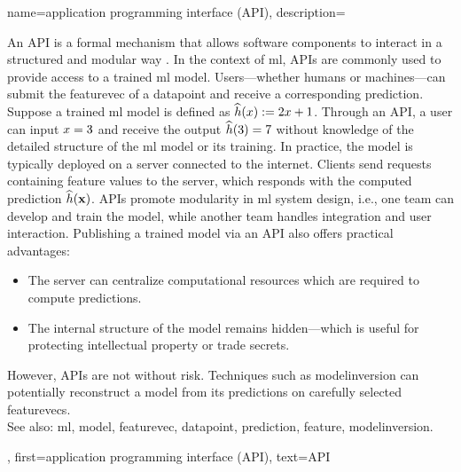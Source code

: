 {name={application programming interface (API)},
		description={			
			An  API is a formal mechanism that 
			allows software components to interact in a structured and modular way \cite{RestfulBook2013}.
			In the context of \gls{ml}, APIs are commonly used to provide access to a trained \gls{ml} \gls{model}. 
			Users—whether humans or machines—can submit the \gls{featurevec} of a \gls{datapoint} and receive 
			a corresponding \gls{prediction}. Suppose a trained \gls{ml} \gls{model} is defined 
			as $\widehat{h}(x) := 2 x + 1$. Through an API, a user 
			can input $x = 3$ and receive the output $\widehat{h}(3) = 7$ 
			without knowledge of the detailed structure of the \gls{ml} \gls{model} or its training. 
			In practice, the \gls{model} is typically deployed on a server connected to the internet. 
			Clients send requests containing \gls{feature} values to the server, which responds with 
			the computed \gls{prediction} $\widehat{h}({\bf x})$. APIs promote modularity 
			in \gls{ml} system design, i.e., one team can develop and train the \gls{model}, while another team
			handles integration and user interaction. Publishing a trained \gls{model} via an API also 
			offers practical advantages: 
			\begin{itemize} 
				\item The server can centralize computational resources which are required to compute \glspl{prediction}. 
		        \item The internal structure of the \gls{model} remains hidden—which is useful for protecting intellectual property or trade secrets. 
		    \end{itemize} 
			However, APIs are not without \gls{risk}. Techniques such as \gls{modelinversion} can potentially reconstruct a 
			\gls{model} from its \glspl{prediction} on carefully selected \glspl{featurevec}.
					\\
		See also: \gls{ml}, \gls{model}, \gls{featurevec}, \gls{datapoint}, \gls{prediction}, \gls{feature}, \gls{modelinversion}.
			},
		first={application programming interface (API)},
		text={API}
}


